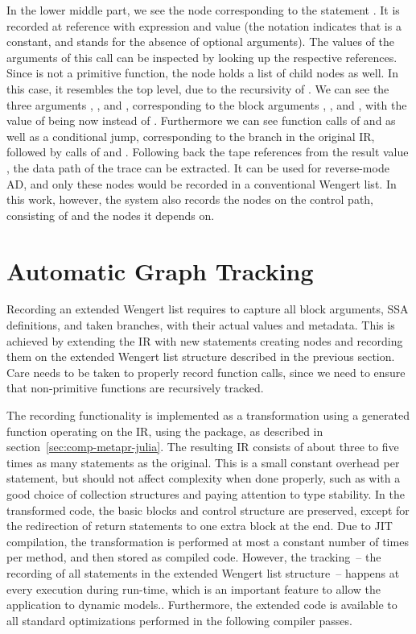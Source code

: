In the lower middle part, we see the node corresponding to the statement .  It is recorded at reference  with expression  and value
 (the notation  indicates that  is a constant, and 
stands for the absence of optional arguments). The values of the arguments of this call can be
inspected by looking up the respective references.  Since  is not a primitive function,
the node holds a list of child nodes as well.  In this case, it resembles the top level, due to the
recursivity of . We can see the three arguments , , and ,
corresponding to the block arguments , , and , with the value of
 being now  instead of .  Furthermore we can see function calls of
 and \jlinl{<} as well as a conditional jump, corresponding to the branch in the
original IR, followed by calls of \jlinl{+} and .  Following back the tape references
from the result value , the data path of the trace can be extracted.  It can be used for
reverse-mode AD, and only these nodes would be recorded in a conventional Wengert list.  In this
work, however, the system also records the nodes on the control path, consisting of  and
the nodes it depends on.


\section{Automatic Graph Tracking}
\label{sec:autom-graph-track}

Recording an extended Wengert list requires to capture all block arguments, SSA definitions, and
taken branches, with their actual values and metadata. This is achieved by extending the IR with new
statements creating nodes and recording them on the extended Wengert list structure described in the
previous section. Care needs to be taken to properly record function calls, since we need to ensure
that non-primitive functions are recursively tracked.

The recording functionality is implemented as a transformation using a generated function operating
on the IR, using the  package, as described in
section~\ref{sec:comp-metapr-julia}.  The resulting IR consists of about three to five times as many
statements as the original.  This is a small constant overhead per statement, but should not affect
complexity when done properly, such as with a good choice of collection structures and paying
attention to type stability.  In the transformed code, the basic blocks and control structure are
preserved, except for the redirection of return statements to one extra block at the end.  Due to
JIT compilation, the transformation is performed at most a constant number of times per method, and
then stored as compiled code.  However, the tracking~-- the recording of all statements in the
extended Wengert list structure~-- happens at every execution during run-time, which is an important
feature to allow the application to dynamic models..  Furthermore, the extended code is available to
all standard optimizations performed in the following compiler passes.

